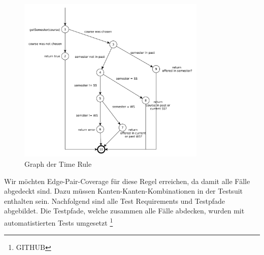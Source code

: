 \documentclass[ngerman]{article}
\begin{document}
\begin{figure}[h!]
\includegraphics[width=0.8\textwidth]{figures/time_rule.pdf}
\caption{Graph der Time Rule}
\label{Fig:graph_time_rule}
\end{figure}

Wir möchten Edge-Pair-Coverage für diese Regel erreichen, da damit alle Fälle abgedeckt sind. 
Dazu müssen Kanten-Kanten-Kombinationen in der Testsuit enthalten sein.
Nachfolgend sind alle Test Requirements und Testpfade abgebildet. Die Testpfade, welche zusammen alle Fälle abdecken, wurden mit automatistierten Tests umgesetzt \footnote{GITHUB} 


\vspace{1em}
\end{document}
